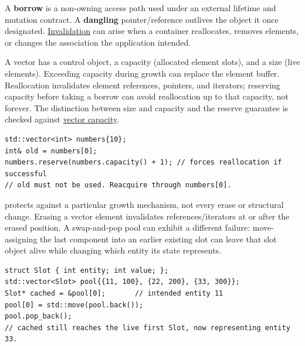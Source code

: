 A \textbf{borrow} is a non-owning access path used under an external lifetime and mutation contract. A \textbf{dangling} pointer/reference outlives the object it once designated. \hyperref[appendix-f9b8b9188c7f]{Invalidation} can arise when a container reallocates, removes elements, or changes the association the application intended.

A vector has a control object, a capacity (allocated element slots), and a size (live elements). Exceeding capacity during growth can replace the element buffer. Reallocation invalidates element references, pointers, and iterators; reserving capacity before taking a borrow can avoid reallocation up to that capacity, not forever. The distinction between size and capacity and the reserve guarantee is checked against \href{https://eel.is/c++draft/vector.capacity}{vector capacity}.

\begin{verbatim}
std::vector<int> numbers{10};
int& old = numbers[0];
numbers.reserve(numbers.capacity() + 1); // forces reallocation if successful
// old must not be used. Reacquire through numbers[0].
\end{verbatim}

 protects against a particular growth mechanism, not every erase or structural change. Erasing a vector element invalidates references/iterators at or after the erased position. A swap-and-pop pool can exhibit a different failure: move-assigning the last component into an earlier existing slot can leave that slot object alive while changing which entity its state represents.

\begin{verbatim}
struct Slot { int entity; int value; };
std::vector<Slot> pool{{11, 100}, {22, 200}, {33, 300}};
Slot* cached = &pool[0];       // intended entity 11
pool[0] = std::move(pool.back());
pool.pop_back();
// cached still reaches the live first Slot, now representing entity 33.
\end{verbatim}

